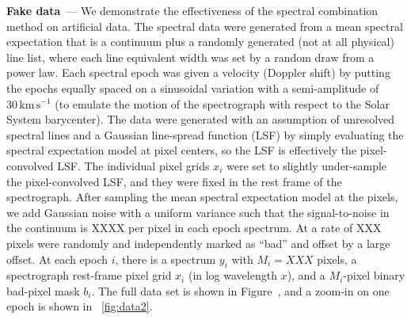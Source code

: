 \documentclass[11pt]{article}
\renewcommand{\paragraph}[1]{\medskip\par\noindent\textbf{#1}~---}
\newcommand{\unit}[1]{\mathrm{#1}}
\newcommand{\kmps}{\unit{km\,s^{-1}}}
\begin{document}
\paragraph{Fake data}
We demonstrate the effectiveness of the spectral combination method on artificial data.
The spectral data were generated from a mean spectral expectation that is a continuum plus a randomly generated (not at all physical) line list, where each line equivalent width was set by a random draw from a power law.
Each spectral epoch was given a velocity (Doppler shift) by putting the epochs equally spaced on a sinusoidal variation with a semi-amplitude of $30\,\kmps$ (to emulate the motion of the spectrograph with respect to the Solar System barycenter).
The data were generated with an assumption of unresolved spectral lines and a Gaussian line-spread function (LSF) by simply evaluating the spectral expectation model at pixel centers, so the LSF is effectively the pixel-convolved LSF.
The individual pixel grids $x_i$ were set to slightly under-sample the pixel-convolved LSF, and they were fixed in the rest frame of the spectrograph.
After sampling the mean spectral expectation model at the pixels, we add Gaussian noise with a uniform variance such that the signal-to-noise in the continuum is XXXX per pixel in each epoch spectrum.
At a rate of XXX pixels were randomly and independently marked as ``bad'' and offset by a large offset.
At each epoch $i$, there is a spectrum $y_i$ with $M_i=XXX$ pixels, a spectrograph rest-frame pixel grid $x_i$ (in log wavelength $x$), and a $M_i$-pixel binary bad-pixel mask $b_i$.
The full data set is shown in Figure~\label{fig:data1}, and a zoom-in on one epoch is shown in \figurename~\ref{fig:data2}.
\end{document}
